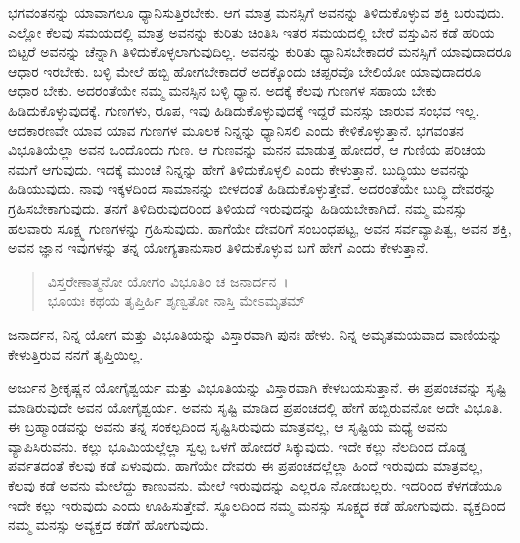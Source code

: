 ಭಗವಂತನನ್ನು ಯಾವಾಗಲೂ ಧ್ಯಾನಿಸುತ್ತಿರಬೇಕು. ಆಗ ಮಾತ್ರ ಮನಸ್ಸಿಗೆ ಅವನನ್ನು ತಿಳಿದುಕೊಳ್ಳುವ ಶಕ್ತಿ ಬರುವುದು. ಎಲ್ಲೋ ಕೆಲವು ಸಮಯದಲ್ಲಿ ಮಾತ್ರ ಅವನನ್ನು ಕುರಿತು ಚಿಂತಿಸಿ ಇತರ ಸಮಯದಲ್ಲಿ ಬೇರೆ ವಸ್ತುವಿನ ಕಡೆ ಹರಿಯ ಬಿಟ್ಟರೆ ಅವನನ್ನು ಚೆನ್ನಾಗಿ ತಿಳಿದುಕೊಳ್ಳಲಾಗುವುದಿಲ್ಲ. ಅವನನ್ನು ಕುರಿತು ಧ್ಯಾನಿಸಬೇಕಾದರೆ ಮನಸ್ಸಿಗೆ ಯಾವುದಾದರೂ ಆಧಾರ ಇರಬೇಕು. ಬಳ್ಳಿ ಮೇಲೆ ಹಬ್ಬಿ ಹೋಗಬೇಕಾದರೆ ಅದಕ್ಕೊಂದು ಚಪ್ಪರವೊ ಬೇಲಿಯೋ ಯಾವುದಾದರೂ ಆಧಾರ ಬೇಕು. ಅದರಂತೆಯೇ ನಮ್ಮ ಮನಸ್ಸಿನ ಬಳ್ಳಿ ಧ್ಯಾನ. ಅದಕ್ಕೆ ಕೆಲವು ಗುಣಗಳ ಸಹಾಯ ಬೇಕು ಹಿಡಿದುಕೊಳ್ಳುವುದಕ್ಕೆ. ಗುಣಗಳು, ರೂಪ, ಇವು ಹಿಡಿದುಕೊಳ್ಳುವುದಕ್ಕೆ ಇದ್ದರೆ ಮನಸ್ಸು ಜಾರುವ ಸಂಭವ ಇಲ್ಲ. ಆದಕಾರಣವೇ ಯಾವ ಯಾವ ಗುಣಗಳ ಮೂಲಕ ನಿನ್ನನ್ನು ಧ್ಯಾನಿಸಲಿ ಎಂದು ಕೇಳಿಕೊಳ್ಳುತ್ತಾನೆ. ಭಗವಂತನ ವಿಭೂತಿಯೆಲ್ಲಾ ಅವನ ಒಂದೊಂದು ಗುಣ. ಆ ಗುಣವನ್ನು ಮನನ ಮಾಡುತ್ತ ಹೋದರೆ, ಆ ಗುಣಿಯ ಪರಿಚಯ ನಮಗೆ ಆಗುವುದು. ಇದಕ್ಕೆ ಮುಂಚೆ ನಿನ್ನನ್ನು ಹೇಗೆ ತಿಳಿದುಕೊಳ್ಳಲಿ ಎಂದು ಕೇಳುತ್ತಾನೆ. ಬುದ್ಧಿಯು ಅವನನ್ನು ಹಿಡಿಯುವುದು. ನಾವು ಇಕ್ಕಳದಿಂದ ಸಾಮಾನನ್ನು ಬೀಳದಂತೆ ಹಿಡಿದುಕೊಳ್ಳುತ್ತೇವೆ. ಅದರಂತೆಯೇ ಬುದ್ಧಿ ದೇವರನ್ನು ಗ್ರಹಿಸಬೇಕಾಗುವುದು. ತನಗೆ ತಿಳಿದಿರುವುದರಿಂದ ತಿಳಿಯದೆ ಇರುವುದನ್ನು ಹಿಡಿಯಬೇಕಾಗಿದೆ. ನಮ್ಮ ಮನಸ್ಸು ಹಲವಾರು ಸೂಕ್ಷ್ಮ ಗುಣಗಳನ್ನು ಗ್ರಹಿಸುವುದು. ಹಾಗೆಯೇ ದೇವರಿಗೆ ಸಂಬಂಧಪಟ್ಟ, ಅವನ ಸರ್ವವ್ಯಾಪಿತ್ವ, ಅವನ ಶಕ್ತಿ, ಅವನ ಜ್ಞಾನ ಇವುಗಳನ್ನು ತನ್ನ ಯೋಗ್ಯತಾನುಸಾರ ತಿಳಿದುಕೊಳ್ಳುವ ಬಗೆ ಹೇಗೆ ಎಂದು ಕೇಳುತ್ತಾನೆ.

\begin{verse}
ವಿಸ್ತರೇಣಾತ್ಮನೋ ಯೋಗಂ ವಿಭೂತಿಂ ಚ ಜನಾರ್ದನ~।\\ಭೂಯಃ ಕಥಯ ತೃಪ್ತಿರ್ಹಿ ಶೃಣ್ವತೋ ನಾಸ್ತಿ ಮೇಽಮೃತಮ್ 
\end{verse}

{\small ಜನಾರ್ದನ, ನಿನ್ನ ಯೋಗ ಮತ್ತು ವಿಭೂತಿಯನ್ನು ವಿಸ್ತಾರವಾಗಿ ಪುನಃ ಹೇಳು. ನಿನ್ನ ಅಮೃತಮಯವಾದ ವಾಣಿಯನ್ನು ಕೇಳುತ್ತಿರುವ ನನಗೆ ತೃಪ್ತಿಯಿಲ್ಲ.}

ಅರ್ಜುನ ಶ‍್ರೀಕೃಷ್ಣನ ಯೋಗೈಶ್ವರ್ಯ ಮತ್ತು ವಿಭೂತಿಯನ್ನು ವಿಸ್ತಾರವಾಗಿ ಕೇಳಬಯಸುತ್ತಾನೆ. ಈ ಪ್ರಪಂಚವನ್ನು ಸೃಷ್ಟಿ ಮಾಡಿರುವುದೇ ಅವನ ಯೋಗೈಶ್ವರ್ಯ. ಅವನು ಸೃಷ್ಟಿ ಮಾಡಿದ ಪ್ರಪಂಚದಲ್ಲಿ ಹೇಗೆ ಹಬ್ಬಿರುವನೋ ಅದೇ ವಿಭೂತಿ. ಈ ಬ್ರಹ್ಮಾಂಡವನ್ನು ಅವನು ತನ್ನ ಸಂಕಲ್ಪದಿಂದ ಸೃಷ್ಟಿಸಿರುವುದು ಮಾತ್ರವಲ್ಲ, ಆ ಸೃಷ್ಟಿಯ ಮಧ್ಯೆ ಅವನು ವ್ಯಾಪಿಸಿರುವನು. ಕಲ್ಲು ಭೂಮಿಯಲ್ಲೆಲ್ಲಾ ಸ್ವಲ್ಪ ಒಳಗೆ ಹೋದರೆ ಸಿಕ್ಕುವುದು. ಇದೇ ಕಲ್ಲು ನೆಲದಿಂದ ದೊಡ್ಡ ಪರ್ವತದಂತೆ ಕೆಲವು ಕಡೆ ಏಳುವುದು. ಹಾಗೆಯೇ ದೇವರು ಈ ಪ್ರಪಂಚದಲ್ಲೆಲ್ಲಾ ಹಿಂದೆ ಇರುವುದು ಮಾತ್ರವಲ್ಲ, ಕೆಲವು ಕಡೆ ಅವನು ಮೇಲೆದ್ದು ಕಾಣುವನು. ಮೇಲೆ ಇರುವುದನ್ನು ಎಲ್ಲರೂ ನೋಡಬಲ್ಲರು. ಇದರಿಂದ ಕೆಳಗಡೆಯೂ ಇದೇ ಕಲ್ಲು ಇರುವುದು ಎಂದು ಊಹಿಸುತ್ತೇವೆ. ಸ್ಥೂಲದಿಂದ ನಮ್ಮ ಮನಸ್ಸು ಸೂಕ್ಷ್ಮದ ಕಡೆ ಹೋಗುವುದು. ವ್ಯಕ್ತದಿಂದ ನಮ್ಮ ಮನಸ್ಸು ಅವ್ಯಕ್ತದ ಕಡೆಗೆ ಹೋಗುವುದು.

